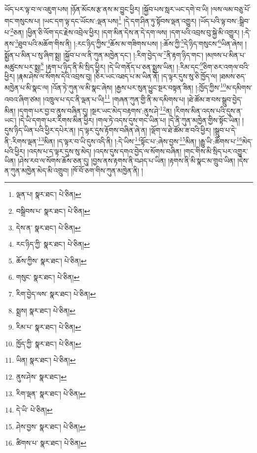 ཡོད་པར་ལྟ་བ་ལ་འཇུག་པས། །ཉོན་མོངས་རྩ་ནས་མ་བྱུང་ཕྱིར། །སྐྱོབ་པས་སླར་ཡང་དགེ་བ་ཡི། །ལས་ལམ་བཅུ་པོ་གང་གསུངས་པ། །ཡང་དག་ལྟ་དང་ཡོངས་:ལྡན་པས།\footnote{ལྡན་པ།  སྣར་ཐང་།  པེ་ཅིན། } །དེ་དག་ཤིན་ཏུ་སྟོབས་ལྡན་འགྱུར། །ཡོད་པའི་ལྟ་བས་:སྒྲིབ་པ་\footnote{བསྒྲིབས་པ་  སྣར་ཐང་།  པེ་ཅིན། }ཅན། །ཕྱིན་ཅི་ལོག་དང་རྗེས་འབྲེལ་ཕྱིར། །དག་མིན་དེས་ན་དེ་དག་ལས། །དག་པའི་འབྲས་བུ་སྐྱེ་མི་འགྱུར། །:དེ་ནས་\footnote{དེས་ན་  སྣར་ཐང་།  པེ་ཅིན། }ཐུབ་པའི་མཆོག་གིས་ནི། །:རང་ཉིད་ཀྱིས་\footnote{རང་ཉིད་ཀྱི་  སྣར་ཐང་།  པེ་ཅིན། }ཆོས་མ་གཟིགས་པས། །:ཆོས་ཀྱི་\footnote{ཆོས་ཀྱིས་  སྣར་ཐང་།  པེ་ཅིན། }དེ་ཉིད་གསུངས་\footnote{གསུང་  སྣར་ཐང་།  པེ་ཅིན། }ཡིན་ཞེས། །སྨྱོན་པ་མིན་པ་སུ་ཞིག་སྨྲ། །སྐྱོབ་པ་ལ་ནི་ཀུན་མཁྱེན་དང་། །:རིག་བྱེད་ལ་\footnote{རིག་བྱེད་ལས་  སྣར་ཐང་།  པེ་ཅིན། }ནི་རྟག་ཉིད་གང་། །མཁས་པ་མིན་པ་མཚུངས་པར་སྨྲ།\footnote{སྨྲས།  སྣར་ཐང་།  པེ་ཅིན། } །རྟག་པ་ཉིད་ནི་མི་སྲིད་ཕྱིར། །དེ་ཡི་གནོད་པ་ཅན་སྨྲས་ཡིན། །:རིམ་དང་\footnote{རིམ་པ་  སྣར་ཐང་།  པེ་ཅིན། }ཅིག་ཅར་འགལ་བའི་ཕྱིར། །རྣམ་ཤེས་ལ་སོགས་དེའི་འབྲས་བུ། །ཅིར་ཡང་འཐད་པ་མ་ཡིན་ནོ། །ད་ལྟར་དུས་སུ་ཅི་ཁྱོད་ལ། །ཐམས་ཅད་མཁྱེན་པ་མི་སྣང་ལ། །འོན་ཏེ་ཀུན་ལ་མི་སྣང་ཞེས། །རྒྱས་པར་སུན་ཕྱུང་སྔར་བསྟན་ཟིན། །:ཁྱོད་ཀྱིས་\footnote{ཁྱོད་ཀྱི་  སྣར་ཐང་།  པེ་ཅིན། }མ་དམིགས་འབའ་ཞིག་ཙམ། །འཁྲུལ་པ་དང་ནི་ལྡན་པ་ཡི།\footnote{ཡིན།  སྣར་ཐང་།  པེ་ཅིན། } །གཞན་ཀུན་གྱི་ནི་མ་དམིགས་པ། །ཐེ་ཚོམ་ཟ་བས་སྒྲུབ་བྱེད་མིན། །དགག་པར་བྱ་བ་ནུས་བཞིན་དུ། །སྔར་ཡང་མེད་བརྟགས་:ནུས་ཤེ་\footnote{ནུས་ཤེས་  སྣར་ཐང་། }ན། །རིགས་མིན་འདས་པའི་དུས་ན་ཡང་། །དེ་ཡི་དགག་པར་རིགས་མིན་ཕྱིར། །གལ་ཏེ་འདས་དུས་གང་ཡིན་པ། །དེ་ནི་ཀུན་མཁྱེན་གྱིས་སྟོང་ཡིན། །དུས་ཉིད་ཡིན་པའི་ཕྱིར་དཔེར་ན། །ད་ལྟར་དུས་རྟོགས་བཞིན་ཞེ་ན། །ལྡོག་ལ་ཐེ་ཚོམ་ཟ་བའི་ཕྱིར། །སྒྲུབ་པ་དེ་ནི་:རིགས་ལྡན་\footnote{རིག་ལྡན་  སྣར་ཐང་།  པེ་ཅིན། }མིན། །ད་ལྟར་བ་ཡི་དུས་འདི་ནི། །:དེ་ཡིས་\footnote{དེ་ཡི་  པེ་ཅིན། }སྟོང་པ་:ཞེས་བྱས་\footnote{ཤེས་བྱས་  སྣར་ཐང་།  པེ་ཅིན། }མིན། །རྒྱུ་ཡི་:ཚོགས་པ་\footnote{ཚིགས་པ་  སྣར་ཐང་།  པེ་ཅིན། }མེད་པའི་ཕྱིར། །འདས་པ་ད་ལྟར་དུས་སུ་མེད། །འདས་དུས་དགའ་བྱེད་ལ་སོགས་བཞིན། །གང་གིས་མི་སྲིད་པར་འགྱུར་ཡིན། །ཤེས་རབ་ལ་སོགས་ཆོས་ཅན་དུ། །བྱས་ནས་རྟགས་ནི་བཤད་པ་ཡིན། །རྟགས་ནི་མི་སྣང་མ་གྲུབ་ཡིན། །དེས་ན་ཀུན་མཁྱེན་མེད་མི་འགྲུབ། །ཁོ་བོ་ཅག་གིས་ཀུན་མཁྱེན་ནི། །
